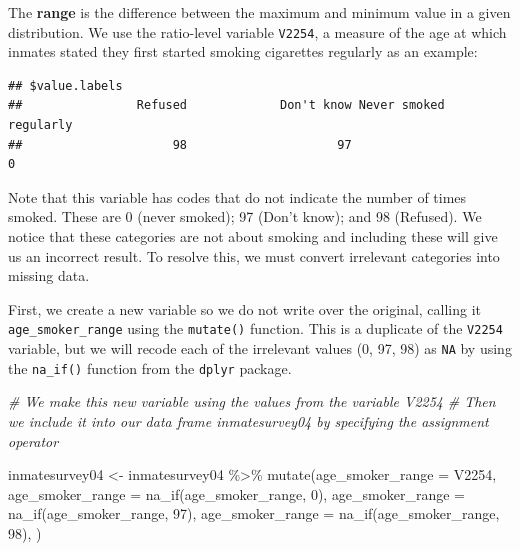 \documentclass[
]{book}
\newenvironment{Shaded}{\begin{snugshade}}{\end{snugshade}}
\newcommand{\AttributeTok}[1]{\textcolor[rgb]{0.77,0.63,0.00}{#1}}
\newcommand{\CommentTok}[1]{\textcolor[rgb]{0.56,0.35,0.01}{\textit{#1}}}
\newcommand{\DecValTok}[1]{\textcolor[rgb]{0.00,0.00,0.81}{#1}}
\newcommand{\FunctionTok}[1]{\textcolor[rgb]{0.00,0.00,0.00}{#1}}
\newcommand{\NormalTok}[1]{#1}
\newcommand{\OtherTok}[1]{\textcolor[rgb]{0.56,0.35,0.01}{#1}}
\newcommand{\SpecialCharTok}[1]{\textcolor[rgb]{0.00,0.00,0.00}{#1}}
\begin{document}
The \textbf{range} is the difference between the maximum and minimum value in a given distribution. We use the ratio-level variable \texttt{V2254}, a measure of the age at which inmates stated they first started smoking cigarettes regularly as an example:

\begin{Shaded}
\end{Shaded}

\begin{verbatim}
## $value.labels
##                Refused             Don't know Never smoked regularly 
##                     98                     97                      0
\end{verbatim}

Note that this variable has codes that do not indicate the number of times smoked. These are 0 (never smoked); 97 (Don't know); and 98 (Refused). We notice that these categories are not about smoking and including these will give us an incorrect result. To resolve this, we must convert irrelevant categories into missing data.

First, we create a new variable so we do not write over the original, calling it \texttt{age\_smoker\_range} using the \texttt{mutate()} function. This is a duplicate of the \texttt{V2254} variable, but we will recode each of the irrelevant values (0, 97, 98) as \texttt{NA} by using the \texttt{na\_if()} function from the \texttt{dplyr} package.

\begin{Shaded}
\begin{Highlighting}[]
\CommentTok{\# We make this new variable using the values from the variable \textquotesingle{}V2254\textquotesingle{}}
\CommentTok{\# Then we include it into our data frame \textquotesingle{}inmatesurvey04\textquotesingle{} by specifying the assignment operator}

\NormalTok{inmatesurvey04 }\OtherTok{\textless{}{-}}\NormalTok{ inmatesurvey04 }\SpecialCharTok{\%\textgreater{}\%} 
  \FunctionTok{mutate}\NormalTok{(}\AttributeTok{age\_smoker\_range =}\NormalTok{ V2254,}
           \AttributeTok{age\_smoker\_range =} \FunctionTok{na\_if}\NormalTok{(age\_smoker\_range, }\DecValTok{0}\NormalTok{),}
          \AttributeTok{age\_smoker\_range =} \FunctionTok{na\_if}\NormalTok{(age\_smoker\_range, }\DecValTok{97}\NormalTok{),}
          \AttributeTok{age\_smoker\_range =} \FunctionTok{na\_if}\NormalTok{(age\_smoker\_range, }\DecValTok{98}\NormalTok{),}
\NormalTok{         )}
\end{Highlighting}
\end{Shaded}
\end{document}
